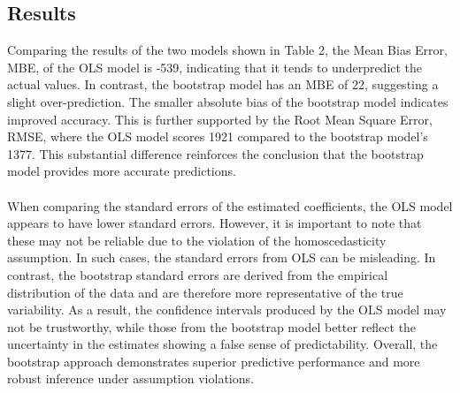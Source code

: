 \subsection{Results}
Comparing the results of the two models shown in Table 2, the Mean Bias Error, MBE, of the OLS model is -539, indicating that it tends to underpredict the actual values. In contrast, the bootstrap model has an MBE of 22, suggesting a slight over-prediction. The smaller absolute bias of the bootstrap model indicates improved accuracy. This is further supported by the Root Mean Square Error, RMSE, where the OLS model scores 1921 compared to the bootstrap model’s 1377. This substantial difference reinforces the conclusion that the bootstrap model provides more accurate predictions.
\\\\
When comparing the standard errors of the estimated coefficients, the OLS model appears to have lower standard errors. However, it is important to note that these may not be reliable due to the violation of the homoscedasticity assumption. In such cases, the standard errors from OLS can be misleading. In contrast, the bootstrap standard errors are derived from the empirical distribution of the data and are therefore more representative of the true variability. As a result, the confidence intervals produced by the OLS model may not be trustworthy, while those from the bootstrap model better reflect the uncertainty in the estimates showing a false sense of predictability. Overall, the bootstrap approach demonstrates superior predictive performance and more robust inference under assumption violations.
\\



